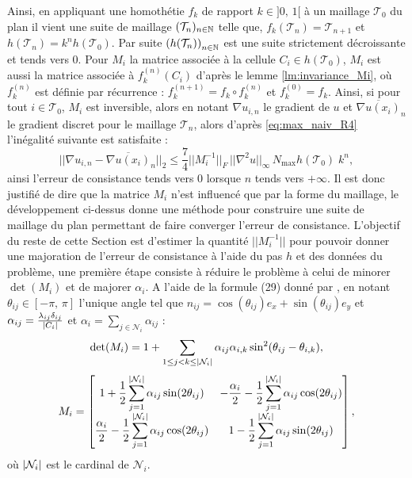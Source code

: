 \documentclass[12pt,a4paper]{article}
\begin{document}
	Ainsi, en appliquant une homothétie $f_k$ de rapport $k \in ]0,\,1[$ à un maillage $\mathcal T_0$ du plan il vient une suite de maillage $(\mathcal T_n)_{n \in \mathbb{N}}$ telle que, $f_k(\mathcal T_n) = \mathcal T_{n+1}$ et $h(\mathcal{T}_n) = k^n h(\mathcal T_0)$. Par suite $\left(h(\mathcal T_n)\right)_{n\in \mathbb{N}}$ est une suite strictement décroissante et tends vers 0. Pour $M_i$ la matrice associée à la cellule $C_i \in h(\mathcal T_0)$, $M_i$ est aussi la matrice associée à $f_k^{(n)}(C_i)$ d'après le lemme \ref{lm:invariance_Mi}, où $f_k^{(n)}$ est définie par récurrence : $f_k^{(n+1)} = f_k \circ f_k^{(n)}$ et $f_k^{(0)} = f_k$. Ainsi, si pour tout $i \in \mathcal T_0$, $M_i$ est inversible, alors en notant $\nabla u_{i,n}$ le gradient de $u$ et $\overline{\nabla u(x_i)}_n$ le gradient discret pour le maillage $\mathcal T_n$, alors d'après \eqref{eq:max_naiv_R4} l’inégalité suivante est satisfaite :
	\[
		|\!|\nabla u_{i,n} - \overline{\nabla u(x_i)}_n|\!|_2 \leq \frac74|\!|M_i^{-1}|\!|_F\, |\!|\nabla^2 u|\!|_\infty\, N_{\max}h(\mathcal T_0)\; k^n,
	\]
	ainsi l'erreur de consistance tends vers 0 lorsque $n$ tends vers  $+\infty$. Il est donc justifié de dire que la matrice $M_i$ n'est influencé que par la forme du maillage, le développement ci-dessus donne une méthode pour construire une suite de maillage du plan permettant de faire converger l'erreur de consistance. L'objectif du reste de cette Section est d'estimer la quantité $|\!|M_i^{-1}|\!|$ pour pouvoir donner une majoration de l'erreur de consistance à l'aide du pas $h$ et des données du problème, une première étape consiste à réduire le problème à celui de minorer $\det(M_i)$ et de majorer $\alpha_i$. A l'aide de la formule (29) donné par \cite{florent}, en notant $\theta_{ij} \in [-\pi,\,\pi]$ l'unique angle tel que $n_{ij} = \cos(\theta_{ij}) e_x + \sin(\theta_{ij})e_y$ et $\alpha_{ij} = \frac{\lambda_{ij}\delta_{ij}}{\left\lvert C_i \right\rvert}$ et $\alpha_i = \displaystyle\sum_{j \in \mathcal N_i} \alpha_{ij}$ :
	\begin{equation}\label{eq:det_Mi}
		\det(M_i) = 1 + \displaystyle\sum_{1\leq j < k \leq \left\lvert \mathcal N_i \right\rvert} \alpha_{ij}\alpha_{i,k}\sin^2(\theta_{ij}-\theta_{i,k}),
	\end{equation}
	\begin{equation}\label{eq:matrice_Mi}
		M_i = \begin{bmatrix}\displaystyle
			1+\frac12\sum_{j=1}^{\left\lvert \mathcal N_i \right\rvert} \alpha_{ij}\sin(2\theta_{ij}) &\displaystyle -\frac{\alpha_i}2-\frac12\sum_{j=1}^{\left\lvert \mathcal N_i \right\rvert} \alpha_{ij}\cos(2\theta_{ij})\\
			\displaystyle\frac{\alpha_i}2-\frac12\sum_{j=1}^{\left\lvert \mathcal N_i \right\rvert} \alpha_{ij}\cos(2\theta_{ij}) & \displaystyle 1-\frac12\sum_{j=1}^{\left\lvert \mathcal N_i \right\rvert} \alpha_{ij}\sin(2\theta_{ij})
		\end{bmatrix},
	\end{equation}
	où $\left\lvert \mathcal N_i \right\rvert$ est le cardinal de $\mathcal N_i$.
	
\end{document}
